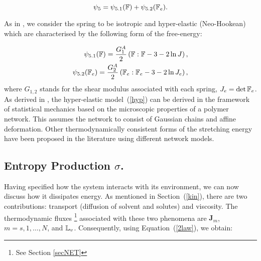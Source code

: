 \begin{equation}
\psi_5 = \psi_{5.1}(\mathbb{F}) + \psi_{5.2}(\mathbb{F}_e).
\end{equation}

As in \cite{ecm2}, we consider the spring to be isotropic and hyper-elastic (Neo-Hookean) which are characterised by the following form of the free-energy:

\begin{eqnarray}
\psi_{5.1}(\mathbb{F}) = \frac{G^A_1}{2} \left(\mathbb{F}:\mathbb{F} - 3 -2 \ln J\right),\\
\psi_{5.2}(\mathbb{F}_e) = \frac{G^A_2}{2} \left(\mathbb{F}_e:\mathbb{F}_e - 3 -2 \ln J_{e}\right),\label{hyp}
\end{eqnarray}
where $G_{1,2}$ stands for the shear modulus associated with each spring, $J_e= \det \mathbb{F}_e$. As derived in \cite{floryprinciples}, the hyper-elastic model~(\ref{hyp}) can be derived in the framework of statistical mechanics based on the microscopic properties of a polymer network. This assumes the network to consist of Gaussian chains and affine deformation. Other thermodynamically consistent forms of the stretching energy have been proposed in the literature \cite{BERGSTROM1998931,boyce2,doibook} using different network models.

\subsection{Entropy Production $\sigma$.}
\label{ent}

Having specified how the system interacts with its environment, we can now discuss how it dissipates energy. As mentioned in Section~(\ref{kin}), there are two contributions: transport (diffusion of solvent and solutes) and viscosity. The thermodynamic fluxes \footnote{See Section \ref{secNET}} associated with these two phenomena are $\mathbf{J}_m$, $m=s,1,\ldots,N$, and $\mathbb{L}_v$. Consequently, using Equation~(\ref{2law}), we obtain:

